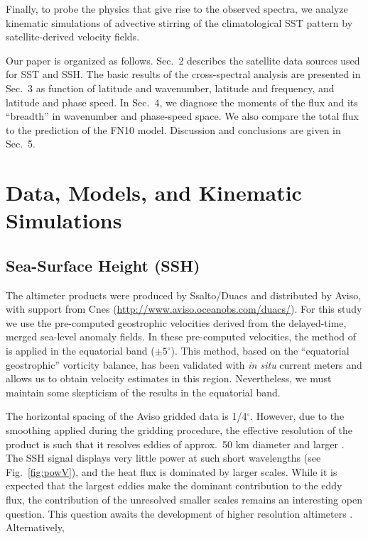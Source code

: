 \documentclass[10pt]{article}
\begin{document}
Finally, to probe the physics that give rise to the observed spectra, we analyze kinematic simulations of advective stirring of the climatological SST pattern by satellite-derived velocity fields.

Our paper is organized as follows. Sec.~2 describes the satellite data sources used for SST and SSH. The basic results of the cross-spectral analysis are presented in Sec.~3 as function of latitude and wavenumber, latitude and frequency, and latitude and phase speed. In Sec.~4, we diagnose the moments of the flux and its ``breadth'' in wavenumber and phase-speed space. We also compare the total flux to the prediction of the FN10 model. Discussion and conclusions are given in Sec.~5.

\section{Data, Models, and Kinematic Simulations}

\subsection{Sea-Surface Height (SSH)}
The altimeter products were produced by Ssalto/Duacs and distributed by Aviso, with support from Cnes (\url{http://www.aviso.oceanobs.com/duacs/}). For this study we use the pre-computed geostrophic velocities derived from the delayed-time, merged sea-level anomaly fields. In these pre-computed velocities, the method of \citet{Lagerloef1999} is applied in the equatorial band ($\pm 5^\circ$). This method, based on the ``equatorial geostrophic'' vorticity balance, has been validated with {\em in situ} current meters and allows us to obtain velocity estimates in this region. Nevertheless, we must maintain some skepticism of the results in the equatorial band.

The horizontal spacing of the Aviso gridded data is 1/4$^\circ$. However, due to the smoothing applied during the gridding procedure, the effective resolution of the product is such that it resolves eddies of approx.~50 km diameter and larger \citep{CheltonEtAl2011}. The SSH signal displays very little power at such short wavelengths (see Fig.~\ref{fig:powV}), and the heat flux is dominated by larger scales. While it is expected that the largest eddies make the dominant contribution to the eddy flux, the contribution of the unresolved smaller scales remains an interesting open question. This question awaits the development of higher resolution altimeters \citep{FuFerrari2008}. Alternatively, 
\end{document}
